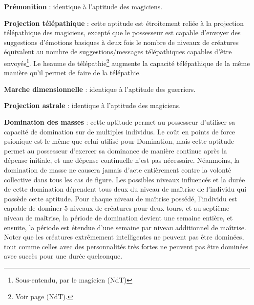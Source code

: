 {\bigskip

\textbf{Prémonition} : identique à l'aptitude des magiciens.

\bigskip

\textbf{Projection télépathique} : cette aptitude est étroitement reliée à la projection télépathique des magiciens, excepté que le possesseur est capable d'envoyer des suggestions d'émotions basiques à deux fois le nombre de niveaux de créatures équivalent au nombre de suggestions/messages télépathiques capables d'être envoyés\footnote{Sous-entendu, par le magicien (NdT)}. Le heaume de télépathie\footnote{Voir page \pageref{objet-heaume-telepathie} (NdT).} augmente la capacité télépathique de la même manière qu'il permet de faire de la télépathie.

\bigskip

\textbf{Marche dimensionnelle} : identique à l'aptitude des guerriers.

\bigskip

\textbf{Projection astrale} : identique à l'aptitude des magiciens.

\bigskip

\textbf{Domination des masses} : cette aptitude permet au possesseur d'utiliser sa capacité de domination sur de multiples individus. Le coût en points de force psionique est le même que celui utilisé pour Domination, mais cette aptitude permet au possesseur d'exercer sa dominance de manière continue après la dépense initiale, et une dépense continuelle n'est pas nécessaire. Néanmoins, la domination de masse ne causera jamais d'acte entièrement contre la volonté collective dans tous les cas de figure. Les possibles niveaux influencés et la durée de cette domination dépendent tous deux du niveau de maîtrise de l'individu qui possède cette aptitude. Pour chaque niveau de maîtrise possédé, l'individu est capable de dominer 5 niveaux de créatures pour deux tours, et au septième niveau de maîtrise, la période de domination devient une semaine entière, et ensuite, la période est étendue d'une semaine par niveau additionnel de maîtrise. Noter que les créatures extrêmement intelligentes ne peuvent pas être dominées, tout comme celles avec des personnalités très fortes ne peuvent pas être dominées avec succès pour une durée quelconque.

}
